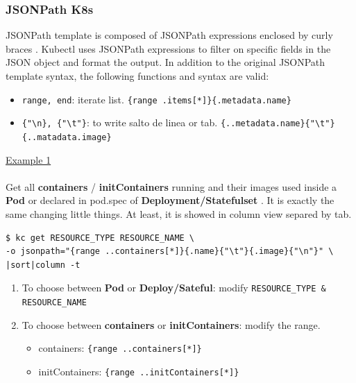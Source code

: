\documentclass{article}
\newenvironment{codetemplate}[1][]{%
  \mybasecolorbox[#1]
  \itshape
}{%
  \endmybasecolorbox
}
\begin{document}
\subsubsection{JSONPath K8s} \label{jsonpath k8s}
JSONPath template is composed of JSONPath expressions enclosed by curly braces {}. Kubectl uses JSONPath expressions to filter on specific fields in the JSON object and format the output. In addition to the original JSONPath template syntax, the following functions and syntax are valid:
\begin{itemize}
    \item \verb|range, end|: iterate list. \verb|{range .items[*]}{.metadata.name}|
    \item \verb|{"\n}, {"\t"}|: to write salto de linea or tab. \verb|{..metadata.name}{"\t"}{..matadata.image}|
\end{itemize}

\underline{Example 1} 
\\
\\
Get all \textbf{containers} / \textbf{initContainers} running and their images used inside a \textbf{Pod} or declared in pod.spec of \textbf{ Deployment/Statefulset} . It is exactly the same changing little things. At least, it is showed in column view separed by tab.
\begin{codetemplate}{}
\begin{verbatim}
$ kc get RESOURCE_TYPE RESOURCE_NAME \
-o jsonpath="{range ..containers[*]}{.name}{"\t"}{.image}{"\n"}" \
|sort|column -t
\end{verbatim}
\end{codetemplate}
\begin{enumerate}
    \item To choose between \textbf{Pod} or \textbf{Deploy/Sateful}: modify  \verb|RESOURCE_TYPE & RESOURCE_NAME|
    \item To choose between \textbf{containers} or \textbf{initContainers}: modify the range.
    \begin{itemize}
        \item containers:  \verb|{range ..containers[*]}|
        \item initContainers: \verb|{range ..initContainers[*]}|
    \end{itemize}
\end{enumerate}
\end{document}

